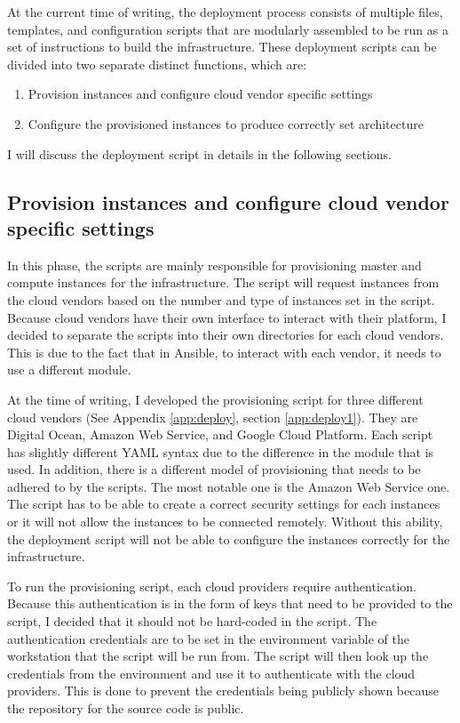 At the current time of writing, the deployment process consists of multiple files, templates, and configuration scripts that are modularly assembled to be run as a set of instructions to build the infrastructure. These deployment scripts can be divided into two separate distinct functions, which are:

\begin{enumerate}
\item Provision instances and configure cloud vendor specific settings
\item Configure the provisioned instances to produce correctly set architecture
\end{enumerate}

I will discuss the deployment script in details in the following sections.


\subsection{Provision instances and configure cloud vendor specific settings}

In this phase, the scripts are mainly responsible for provisioning master and compute instances for the infrastructure. The script will request instances from the cloud vendors based on the number and type of instances set in the script. Because cloud vendors have their own interface to interact with their platform, I decided to separate the scripts into their own directories for each cloud vendors. This is due to the fact that in Ansible, to interact with each vendor, it needs to use a different module.

At the time of writing, I developed the provisioning script for three different cloud vendors (See Appendix \ref{app:deploy}, section \ref{app:deploy1}). They are Digital Ocean, Amazon Web Service, and Google Cloud Platform. Each script has slightly different YAML syntax due to the difference in the module that is used. In addition, there is a different model of provisioning that needs to be adhered to by the scripts. The most notable one is the Amazon Web Service one. The script has to be able to create a correct security settings for each instances or it will not allow the instances to be connected remotely. Without this ability, the deployment script will not be able to configure the instances correctly for the infrastructure.

To run the provisioning script, each cloud providers require authentication. Because this authentication is in the form of keys that need to be provided to the script, I decided that it should not be hard-coded in the script. The authentication credentials are to be set in the environment variable of the workstation that the script will be run from. The script will then look up the credentials from the environment and use it to authenticate with the cloud providers. This is done to prevent the credentials being publicly shown because the repository for the source code is public.

